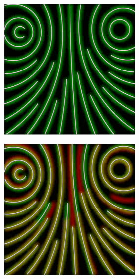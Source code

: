 \begin{figure}[ht]
\begin{subfigure}{\textwidth}
\begin{subfigure}{.19\textwidth}
        \end{subfigure}
        \begin{subfigure}{.19\textwidth}
            \centering
            \includegraphics[scale=.0515]{figures/AlphaStudy/Gyro13C.0001.png}
        \end{subfigure}
        \begin{subfigure}{.19\textwidth}
            \centering
            \includegraphics[scale=.0515]{figures/AlphaStudy/Gyro13C.0002.png}

\end{subfigure}
\end{subfigure}
\end{figure}
